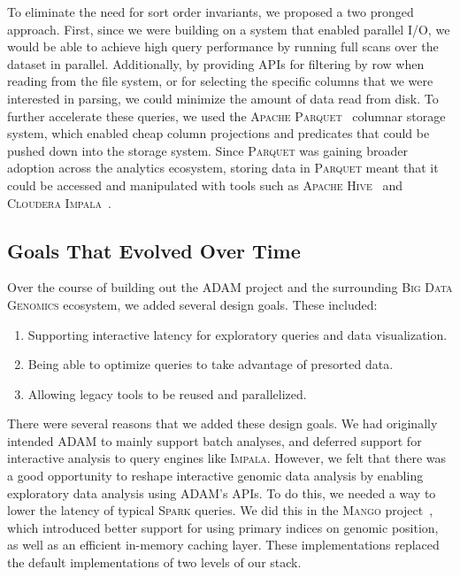 \documentclass[phd]{ucbthesis}
\begin{document}
To eliminate the need for sort order invariants, we proposed a two pronged
approach. First, since we were building on a system that enabled parallel I/O,
we would be able to achieve high query performance by running full scans over
the dataset in parallel. Additionally, by providing APIs for filtering by row
when reading from the file system, or for selecting the specific columns that
we were interested in parsing, we could minimize the amount of data read from
disk. To further accelerate these queries, we used the \textsc{Apache
  Parquet}~\cite{parquet} columnar storage system, which enabled cheap column
projections and predicates that could be pushed down into the storage system.
Since \textsc{Parquet} was gaining broader adoption across the analytics
ecosystem, storing data in \textsc{Parquet} meant that it could be accessed
and manipulated with tools such as \textsc{Apache Hive}~\cite{thusoo09}
and \textsc{Cloudera Impala}~\cite{kornacker15}.

\subsection{Goals That Evolved Over Time}
\label{sec:evolved-goals}

Over the course of building out the \textsc{ADAM} project and the surrounding
\textsc{Big Data Genomics} ecosystem, we added several design goals. These
included:

\begin{enumerate}
\item Supporting interactive latency for exploratory queries and data
  visualization.
\item Being able to optimize queries to take advantage of presorted data.
\item Allowing legacy tools to be reused and parallelized.
\end{enumerate}

There were several reasons that we added these design goals. We had
originally intended \textsc{ADAM} to mainly support batch analyses, and deferred
support for interactive analysis to query engines like \textsc{Impala}. However,
we felt that there was a good opportunity to reshape interactive genomic data
analysis by enabling exploratory data analysis using \textsc{ADAM}'s APIs. To do
this, we needed a way to lower the latency of typical \textsc{Spark} queries. We
did this in the \textsc{Mango} project~\cite{tu16, morrow17}, which introduced
better support for using primary indices on genomic position, as well as an
efficient in-memory caching layer. These implementations replaced the default
implementations of two levels of our stack.
\end{document}

